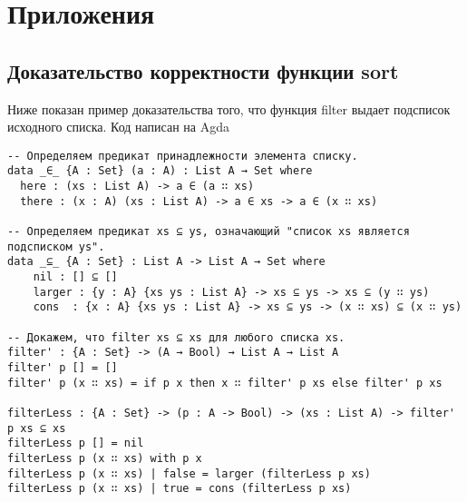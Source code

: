 \appendix
\section*{Приложения}
\renewcommand{\thesubsection}{\Alph{subsection}}

\subsection{Доказательство корректности функции sort}\label{sort_proof}

Ниже показан пример доказательства того, что функция filter выдает подсписок исходного списка.
Код написан на Agda\cite{agda}

\begin{lstlisting}
-- Определяем предикат принадлежности элемента списку.
data _∈_ {A : Set} (a : A) : List A → Set where
  here : (xs : List A) -> a ∈ (a ∷ xs)
  there : (x : A) (xs : List A) -> a ∈ xs -> a ∈ (x ∷ xs)

-- Определяем предикат xs ⊆ ys, означающий "список xs является подсписком ys".
data _⊆_ {A : Set} : List A -> List A → Set where
    nil : [] ⊆ []
    larger : {y : A} {xs ys : List A} -> xs ⊆ ys -> xs ⊆ (y ∷ ys)
    cons  : {x : A} {xs ys : List A} -> xs ⊆ ys -> (x ∷ xs) ⊆ (x ∷ ys)

-- Докажем, что filter xs ⊆ xs для любого списка xs.
filter' : {A : Set} -> (A → Bool) → List A → List A
filter' p [] = []
filter' p (x ∷ xs) = if p x then x ∷ filter' p xs else filter' p xs

filterLess : {A : Set} -> (p : A -> Bool) -> (xs : List A) -> filter' p xs ⊆ xs
filterLess p [] = nil
filterLess p (x ∷ xs) with p x
filterLess p (x ∷ xs) | false = larger (filterLess p xs)
filterLess p (x ∷ xs) | true = cons (filterLess p xs)

\end{lstlisting}



